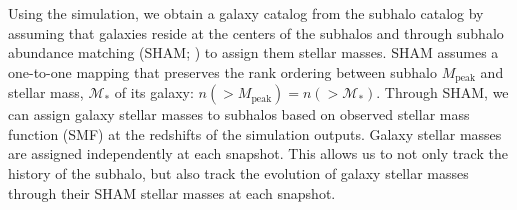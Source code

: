 Using the \cite{Wetzel:2013aa} simulation, we obtain a galaxy 
catalog from the subhalo catalog by assuming that galaxies 
reside at the centers of the subhalos and through subhalo abundance matching 
(SHAM; \citealt{Vale:2006aa, Conroy:2006aa, Yang:2009aa, Wetzel:2012aa, 
Leja:2013aa, Wetzel:2013aa, Wetzel:2014aa}) to assign them stellar masses. 
SHAM assumes a one-to-one mapping that preserves the rank 
ordering between subhalo $M_\mathrm{peak}$ and stellar mass, $\mathcal{M}_*$ 
of its galaxy: $n(>M_\mathrm{peak}) = n(> \mathcal{M}_*)$. Through SHAM, we can 
assign galaxy stellar masses to subhalos based on observed stellar mass function 
(SMF) at the redshifts of the simulation outputs. 
Galaxy stellar masses are assigned independently at each snapshot.
This allows us to not only track the history 
of the subhalo, but also track the evolution of galaxy stellar masses through 
their SHAM stellar masses at each snapshot.

